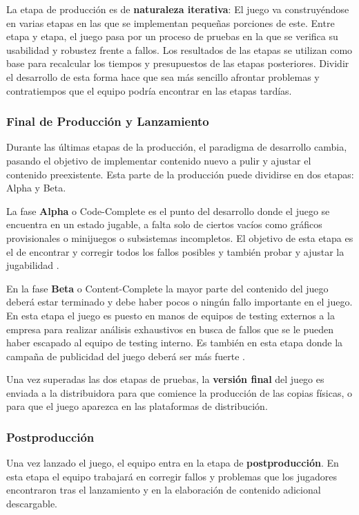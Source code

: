 La etapa de producción es de \textbf{naturaleza iterativa}: El juego va construyéndose en varias etapas en las que se implementan pequeñas porciones de este. Entre etapa y etapa, el juego pasa por un proceso de pruebas en la que se verifica su usabilidad y robustez frente a fallos. Los resultados de las etapas se utilizan como base para recalcular los tiempos y presupuestos de las etapas posteriores. Dividir el desarrollo de esta forma hace que sea más sencillo afrontar problemas y contratiempos que el equipo podría encontrar en las etapas tardías.

\subsubsection{Final de Producción y Lanzamiento}
Durante las últimas etapas de la producción, el paradigma de desarrollo cambia, pasando el objetivo de implementar contenido nuevo a pulir y ajustar el contenido preexistente. Esta parte de la producción puede dividirse en dos etapas: Alpha y Beta.

La fase \textbf{Alpha} o Code-Complete es el punto del desarrollo donde el juego se encuentra en un estado jugable, a falta solo de ciertos vacíos como gráficos provisionales o minijuegos o subsistemas incompletos. El objetivo de esta etapa es el de encontrar y corregir todos los fallos posibles y también probar y ajustar la jugabilidad \cite{development_and_production}.

En la fase \textbf{Beta} o Content-Complete la mayor parte del contenido del juego deberá estar terminado y debe haber pocos o ningún fallo importante en el juego. En esta etapa el juego es puesto en manos de equipos de testing externos a la empresa para realizar análisis exhaustivos en busca de fallos que se le pueden haber escapado al equipo de testing interno. Es también en esta etapa donde la campaña de publicidad del juego deberá ser más fuerte \cite{development_and_production}.

Una vez superadas las dos etapas de pruebas, la \textbf{versión final} del juego es enviada a la distribuidora para que comience la producción de las copias físicas, o para que el juego aparezca en las plataformas de distribución.

\subsubsection{Postproducción}
Una vez lanzado el juego, el equipo entra en la etapa de \textbf{postproducción}. En esta etapa el equipo trabajará en corregir fallos y problemas que los jugadores encontraron tras el lanzamiento y en la elaboración de contenido adicional descargable.

